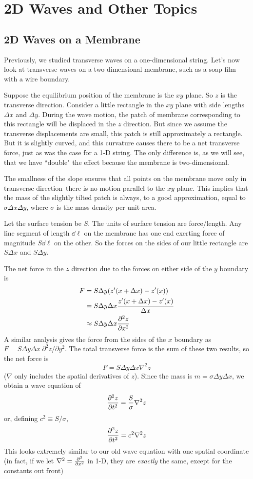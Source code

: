\chapter{2D Waves and Other Topics}
\section{2D Waves on a Membrane}
Previously, we studied transverse waves on a one-dimensional string. Let's now look at transverse waves on a two-dimensional membrane, such as a soap film with a wire boundary. 

Suppose the equilibrium position of the membrane is the $xy$ plane. So $z$ is the transverse direction. Consider a little rectangle in the $xy$ plane with side lengths $\Delta x$ and $\Delta y$. During the wave motion, the patch of membrane corresponding to this rectangle will be displaced in the $z$ direction. But since we assume the transverse displacements are small, this patch is still approximately a rectangle. But it is slightly curved, and this curvature causes there to be a net transverse force, just as was the case for a 1-D string. The only difference is, as we will see, that we have ``double" the effect because the membrane is two-dimensional. 

The smallness of the slope ensures that all points on the membrane move only in transverse direction--there is no motion parallel to the $xy$ plane. This implies that the mass of the slightly tilted patch is always, to a good approximation, equal to $\sigma\Delta x\Delta y$, where $\sigma$ is the mass density per unit area.

Let the surface tension be $S$. The units of surface tension are force/length. Any line segment of length $\dd\ell$ on the membrane has one end exerting force of magnitude $S\dd\ell$ on the other. So the forces on the sides of our little rectangle are $S\Delta x$ and $S\Delta y$.

The net force in the $z$ direction due to the forces on either side of the $y$ boundary is
\begin{align*}
    F &= S\Delta y \pqty{z'(x + \Delta x) - z'(x)} \\
    &= S \Delta y \Delta x \frac{z'(x + \Delta x) - z'(x)}{\Delta x} \\
    &\approx S\Delta y\Delta x \pdv[2]{z}{x}
\end{align*}
A similar analysis gives the force from the sides of the $x$ boundary as $F = S \Delta y\Delta x \; \partial ^2 z/\partial y^2$. The total transverse force is the sum of these two results, so the net force is
\[ F = S \Delta y \Delta x \nabla^2 z\]
($\nabla$ only includes the spatial derivatives of $z$). Since the mass is $m = \sigma \Delta y\Delta x$, we obtain a wave equation of
\[ \pdv[2]{z}{t} = \frac{S}{\sigma} \nabla^2 z\]
or, defining $c^2 \equiv S/\sigma$,
\[ \pdv[2]{z}{t} = c^2\nabla^2z\]
This looks extremely similar to our old wave equation with one spatial coordinate (in fact, if we let $\nabla^2 = \pdv[2]{x}$ in 1-D, they are \textit{exactly} the same, except for the constants out front)

